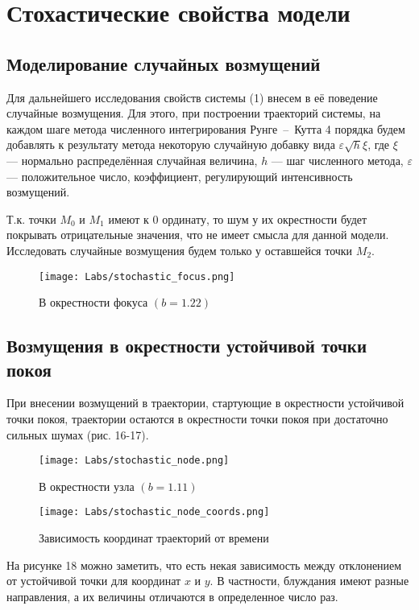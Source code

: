 \documentclass[a4paper,14pt]{extarticle}
\begin{document}
\newpage
\section{Стохастические свойства модели}
\subsection{Моделирование случайных возмущений}
Для дальнейшего исследования свойств системы (1) внесем в её поведение случайные возмущения. Для этого, при построении траекторий системы, на каждом шаге метода численного интегрирования Рунге~--~Кутта 4 порядка будем добавлять к результату метода некоторую случайную добавку вида $\varepsilon  \sqrt{h} \xi$, где $\xi$ --- нормально распределённая случайная величина, $h$ --- шаг численного метода, $\varepsilon$ --- положительное число, коэффициент, регулирующий интенсивность возмущений.

Т.к. точки $M_0$ и $M_1$ имеют к 0 ординату, то шум у их окрестности будет покрывать отрицательные значения, что не имеет смысла для данной модели. Исследовать случайные возмущения будем только у оставшейся точки $M_2$.

\begin{figure}[!h]
\centering
\texttt{[image: Labs/stochastic\_focus.png]}
\caption{В окрестности фокуса $(b=1.22)$}
\label{sotch_focus}
\end{figure}

\newpage
\subsection{Возмущения в окрестности устойчивой точки покоя}
При внесении возмущений в траектории, стартующие в окрестности устойчивой точки покоя, траектории остаются в окрестности точки покоя при достаточно сильных шумах (рис. 16-17). 


\begin{figure}[!h]
\centering
\texttt{[image: Labs/stochastic\_node.png]}
\caption{В окрестности узла $(b=1.11)$}
\label{sotch_node}
\end{figure}

\newpage
\begin{figure}[!h]
\centering
\texttt{[image: Labs/stochastic\_node\_coords.png]}
\caption{Зависимость координат траекторий от времени}
\label{sotch_node_coord}
\end{figure}

На рисунке 18 можно заметить, что есть некая зависимость между отклонением от устойчивой точки для координат $x$ и $y$. В частности, блуждания имеют разные направления, а их величины отличаются в определенное число раз.
\end{document}
